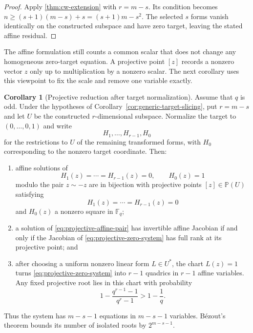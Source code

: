\documentclass[11pt,a4paper]{article}
\theoremstyle{definition}
\newtheorem{corollary}[theorem]{Corollary}
\theoremstyle{remark}
\newcommand{\F}{\mathbb F}
\newcommand{\PP}{\mathbb P}
\begin{document}
\begin{proof}
Apply \cref{thm:cw-extension} with $r=m-s$.  Its condition becomes
$n\ge(s+1)(m-s)+s=(s+1)m-s^2$.  The selected $s$ forms vanish identically on
the constructed subspace and have zero target, leaving the stated affine
residual.
\end{proof}

The affine formulation still counts a common scalar that does not change any
homogeneous zero-target equation.  A projective point $[z]$ records a nonzero
vector $z$ only up to multiplication by a nonzero scalar.  The next corollary
uses this viewpoint to fix the scale and remove one variable exactly.

\begin{corollary}[Projective reduction after target normalization]\label{cor:projective-target-slicing}
Assume that $q$ is odd.  Under the hypotheses of
Corollary~\ref{cor:generic-target-slicing}, put $r=m-s$ and let
$U$ be the constructed $r$-dimensional subspace.  Normalize the target to
$(0,\ldots,0,1)$ and write
\[
 H_1,\ldots,H_{r-1},H_0
\]
for the restrictions to $U$ of the remaining transformed forms, with $H_0$
corresponding to the nonzero target coordinate.  Then:
\begin{enumerate}
\item affine solutions of
\begin{equation}\label{eq:projective-affine-pair}
 H_1(z)=\cdots=H_{r-1}(z)=0,
 \qquad H_0(z)=1
\end{equation}
modulo the pair $z\sim-z$ are in bijection with projective points
$[z]\in\PP(U)$ satisfying
\begin{equation}\label{eq:projective-zero-system}
 H_1(z)=\cdots=H_{r-1}(z)=0
\end{equation}
and $H_0(z)$ a nonzero square in $\F_q$;
\item a solution of \eqref{eq:projective-affine-pair} has invertible affine
Jacobian if and only if the Jacobian of
\eqref{eq:projective-zero-system} has full rank at its projective point; and
\item after choosing a uniform nonzero linear form $L\in U^*$, the chart
$L(z)=1$ turns \eqref{eq:projective-zero-system} into $r-1$ quadrics in
$r-1$ affine variables.  Any fixed projective root lies in this chart with
probability
\[
 1-\frac{q^{r-1}-1}{q^r-1}>1-\frac1q.
\]
\end{enumerate}
Thus the system has $m-s-1$ equations in $m-s-1$ variables.  B\'ezout's
theorem bounds its number of isolated roots by $2^{m-s-1}$.
\end{corollary}
\end{document}
